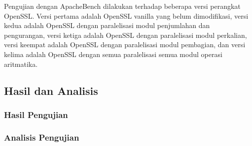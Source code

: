 Pengujian dengan ApacheBench dilakukan terhadap beberapa versi perangkat OpenSSL. Versi pertama adalah OpenSSL vanilla yang belum dimodifikasi, versi kedua adalah OpenSSL dengan paralelisasi modul penjumlahan dan pengurangan, versi ketiga adalah OpenSSL dengan paralelisasi modul perkalian, versi keempat adalah OpenSSL dengan paralelisasi modul pembagian, dan versi kelima adalah OpenSSL dengan semua paralelisasi semua modul operasi aritmatika.

\subsection{Hasil dan Analisis}
\subsubsection{Hasil Pengujian}

\subsubsection{Analisis Pengujian}
